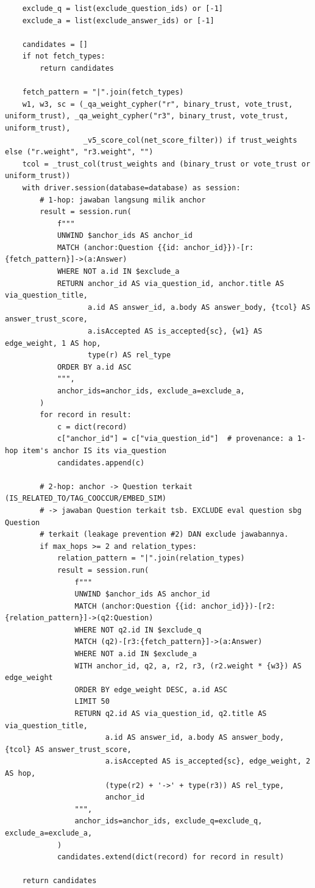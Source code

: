 \begin{lstlisting}
    exclude_q = list(exclude_question_ids) or [-1]
    exclude_a = list(exclude_answer_ids) or [-1]

    candidates = []
    if not fetch_types:
        return candidates

    fetch_pattern = "|".join(fetch_types)
    w1, w3, sc = (_qa_weight_cypher("r", binary_trust, vote_trust, uniform_trust), _qa_weight_cypher("r3", binary_trust, vote_trust, uniform_trust),
                  _v5_score_col(net_score_filter)) if trust_weights else ("r.weight", "r3.weight", "")
    tcol = _trust_col(trust_weights and (binary_trust or vote_trust or uniform_trust))
    with driver.session(database=database) as session:
        # 1-hop: jawaban langsung milik anchor
        result = session.run(
            f"""
            UNWIND $anchor_ids AS anchor_id
            MATCH (anchor:Question {{id: anchor_id}})-[r:{fetch_pattern}]->(a:Answer)
            WHERE NOT a.id IN $exclude_a
            RETURN anchor_id AS via_question_id, anchor.title AS via_question_title,
                   a.id AS answer_id, a.body AS answer_body, {tcol} AS answer_trust_score,
                   a.isAccepted AS is_accepted{sc}, {w1} AS edge_weight, 1 AS hop,
                   type(r) AS rel_type
            ORDER BY a.id ASC
            """,
            anchor_ids=anchor_ids, exclude_a=exclude_a,
        )
        for record in result:
            c = dict(record)
            c["anchor_id"] = c["via_question_id"]  # provenance: a 1-hop item's anchor IS its via_question
            candidates.append(c)

        # 2-hop: anchor -> Question terkait (IS_RELATED_TO/TAG_COOCCUR/EMBED_SIM)
        # -> jawaban Question terkait tsb. EXCLUDE eval question sbg Question
        # terkait (leakage prevention #2) DAN exclude jawabannya.
        if max_hops >= 2 and relation_types:
            relation_pattern = "|".join(relation_types)
            result = session.run(
                f"""
                UNWIND $anchor_ids AS anchor_id
                MATCH (anchor:Question {{id: anchor_id}})-[r2:{relation_pattern}]->(q2:Question)
                WHERE NOT q2.id IN $exclude_q
                MATCH (q2)-[r3:{fetch_pattern}]->(a:Answer)
                WHERE NOT a.id IN $exclude_a
                WITH anchor_id, q2, a, r2, r3, (r2.weight * {w3}) AS edge_weight
                ORDER BY edge_weight DESC, a.id ASC
                LIMIT 50
                RETURN q2.id AS via_question_id, q2.title AS via_question_title,
                       a.id AS answer_id, a.body AS answer_body, {tcol} AS answer_trust_score,
                       a.isAccepted AS is_accepted{sc}, edge_weight, 2 AS hop,
                       (type(r2) + '->' + type(r3)) AS rel_type,
                       anchor_id
                """,
                anchor_ids=anchor_ids, exclude_q=exclude_q, exclude_a=exclude_a,
            )
            candidates.extend(dict(record) for record in result)

    return candidates
\end{lstlisting}

